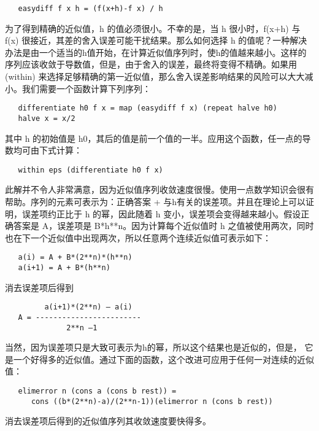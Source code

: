 \documentclass[12pt,a4paper]{article}
\begin{document}
\begin{verbatim}
   easydiff f x h = (f(x+h)-f x) / h
\end{verbatim}

为了得到精确的近似值，h 的值必须很小。不幸的是，当 h 很小时，f(x+h) 与 f(x) 很接近，其差的舍入误差可能干扰结果。那么如何选择 h 的值呢？一种解决办法是由一个适当的h值开始，在计算近似值序列时，使h的值越来越小。这样的序列应该收敛于导数值，但是，由于舍入的误差，最终将变得不精确。如果用 (within) 来选择足够精确的第一近似值，那么舍入误差影响结果的风险可以大大减小。我们需要一个函数计算下列序列：

\begin{verbatim}
   differentiate h0 f x = map (easydiff f x) (repeat halve h0)
   halve x = x/2
\end{verbatim}

其中 h 的初始值是 h0，其后的值是前一个值的一半。应用这个函数，任一点的导数均可由下式计算：

\begin{verbatim}
   within eps (differentiate h0 f x)
\end{verbatim}

此解并不令人非常满意，因为近似值序列收敛速度很慢。使用一点数学知识会很有帮助。序列的元素可表示为：正确答案 + 与h有关的误差项。并且在理论上可以证明，误差项约正比于 h 的幂，因此随着 h 变小，误差项会变得越来越小。假设正确答案是 A，误差项是 B*h**n。因为计算每个近似值时 h 之值被使用两次，同时也在下一个近似值中出现两次，所以任意两个连续近似值可表示如下：

\begin{verbatim}
   a(i) = A + B*(2**n)*(h**n)
   a(i+1) = A + B*(h**n)
\end{verbatim}

消去误差项后得到

\begin{verbatim}
         a(i+1)*(2**n) – a(i)
   A = ------------------------
              2**n –1
\end{verbatim}

当然，因为误差项只是大致可表示为h的幂，所以这个结果也是近似的，但是， 它是一个好得多的近似值。通过下面的函数，这个改进可应用于任何一对连续的近似值：

\begin{verbatim}
   elimerror n (cons a (cons b rest)) = 
      cons ((b*(2**n)-a)/(2**n-1))(elimerror n (cons b rest))
\end{verbatim}

消去误差项后得到的近似值序列其收敛速度要快得多。
\end{document}
